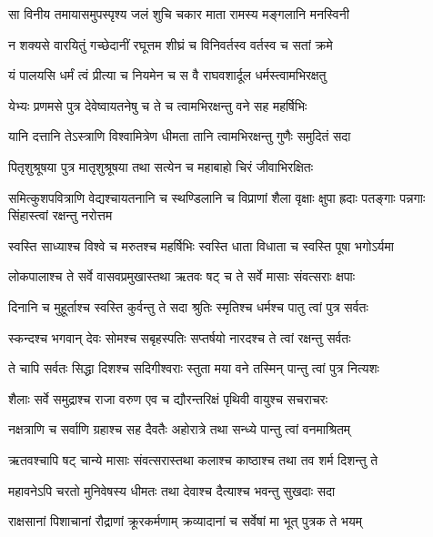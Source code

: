 
\twolineshloka
{सा विनीय तमायासमुपस्पृश्य जलं शुचि}
{चकार माता रामस्य मङ्गलानि मनस्विनी} %

\twolineshloka
{न शक्यसे वारयितुं गच्छेदानीं रघूत्तम}
{शीघ्रं च विनिवर्तस्व वर्तस्व च सतां क्रमे} %

\twolineshloka
{यं पालयसि धर्मं त्वं प्रीत्या च नियमेन च}
{स वै राघवशार्दूल धर्मस्त्वामभिरक्षतु} %

\twolineshloka
{येभ्यः प्रणमसे पुत्र देवेष्वायतनेषु च}
{ते च त्वामभिरक्षन्तु वने सह महर्षिभिः} %

\twolineshloka
{यानि दत्तानि तेऽस्त्राणि विश्वामित्रेण धीमता}
{तानि त्वामभिरक्षन्तु गुणैः समुदितं सदा} %

\twolineshloka
{पितृशुश्रूषया पुत्र मातृशुश्रूषया तथा}
{सत्येन च महाबाहो चिरं जीवाभिरक्षितः} %

\threelineshloka
{समित्कुशपवित्राणि वेद्यश्चायतनानि च}
{स्थण्डिलानि च विप्राणां शैला वृक्षाः क्षुपा ह्रदाः}
{पतङ्गाः पन्नगाः सिंहास्त्वां रक्षन्तु नरोत्तम} %

\twolineshloka
{स्वस्ति साध्याश्च विश्वे च मरुतश्च महर्षिभिः}
{स्वस्ति धाता विधाता च स्वस्ति पूषा भगोऽर्यमा} %

\twolineshloka
{लोकपालाश्च ते सर्वे वासवप्रमुखास्तथा}
{ऋतवः षट् च ते सर्वे मासाः संवत्सराः क्षपाः} %

\twolineshloka
{दिनानि च मुहूर्ताश्च स्वस्ति कुर्वन्तु ते सदा}
{श्रुतिः स्मृतिश्च धर्मश्च पातु त्वां पुत्र सर्वतः} %

\twolineshloka
{स्कन्दश्च भगवान् देवः सोमश्च सबृहस्पतिः}
{सप्तर्षयो नारदश्च ते त्वां रक्षन्तु सर्वतः} %

\twolineshloka
{ते चापि सर्वतः सिद्धा दिशश्च सदिगीश्वराः}
{स्तुता मया वने तस्मिन् पान्तु त्वां पुत्र नित्यशः} %

\twolineshloka
{शैलाः सर्वे समुद्राश्च राजा वरुण एव च}
{द्यौरन्तरिक्षं पृथिवी वायुश्च सचराचरः} %

\twolineshloka
{नक्षत्राणि च सर्वाणि ग्रहाश्च सह दैवतैः}
{अहोरात्रे तथा सन्ध्ये पान्तु त्वां वनमाश्रितम्} %

\twolineshloka
{ऋतवश्चापि षट् चान्ये मासाः संवत्सरास्तथा}
{कलाश्च काष्ठाश्च तथा तव शर्म दिशन्तु ते} %

\twolineshloka
{महावनेऽपि चरतो मुनिवेषस्य धीमतः}
{तथा देवाश्च दैत्याश्च भवन्तु सुखदाः सदा} %

\twolineshloka
{राक्षसानां पिशाचानां रौद्राणां क्रूरकर्मणाम्}
{क्रव्यादानां च सर्वेषां मा भूत् पुत्रक ते भयम्} %

